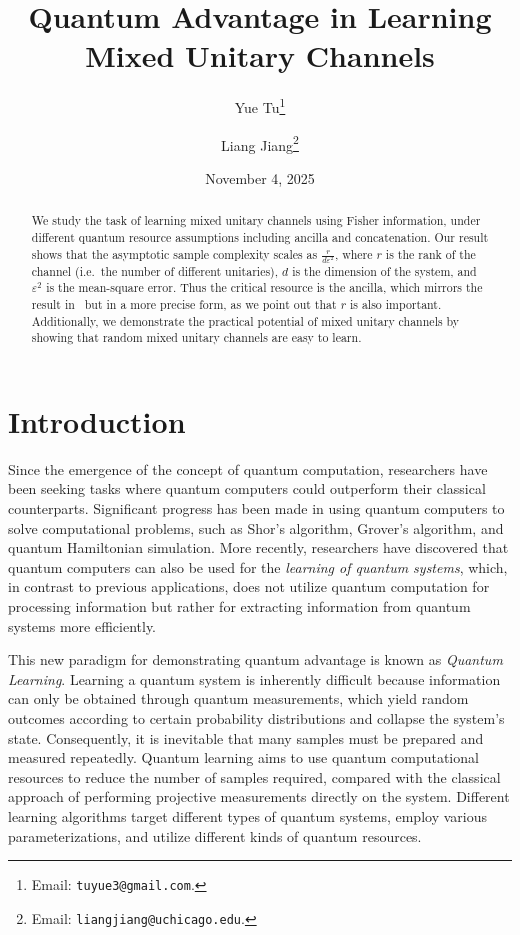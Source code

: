 \documentclass[12pt]{article}
\begin{document}
\title{Quantum Advantage in Learning Mixed Unitary Channels}

\author{
    Yue Tu\thanks{Email: \texttt{tuyue3@gmail.com}.} 
    \and 
    Liang Jiang\thanks{Email: \texttt{liangjiang@uchicago.edu}.}
}

\date{November 4, 2025}

\maketitle


\begin{abstract}
We study the task of learning mixed unitary channels using Fisher information, under different quantum resource assumptions including ancilla and concatenation. Our result shows that the asymptotic sample complexity scales as $\frac{r}{d\varepsilon^2}$, where $r$ is the rank of the channel (i.e.\ the number of different unitaries), $d$ is the dimension of the system, and $\varepsilon^2$ is the mean-square error. Thus the critical resource is the ancilla, which mirrors the result in~\cite{chen2022quantum} but in a more precise form, as we point out that $r$ is also important. Additionally, we demonstrate the practical potential of mixed unitary channels by showing that random mixed unitary channels are easy to learn.
\end{abstract}

\tableofcontents

\section{Introduction}

Since the emergence of the concept of quantum computation, researchers have been seeking tasks where quantum computers could outperform their classical counterparts. Significant progress has been made in using quantum computers to solve computational problems, such as Shor’s algorithm, Grover’s algorithm, and quantum Hamiltonian simulation. More recently, researchers have discovered that quantum computers can also be used for the \emph{learning of quantum systems}, which, in contrast to previous applications, does not utilize quantum computation for processing information but rather for extracting information from quantum systems more efficiently.

This new paradigm for demonstrating quantum advantage is known as \emph{Quantum Learning}. Learning a quantum system is inherently difficult because information can only be obtained through quantum measurements, which yield random outcomes according to certain probability distributions and collapse the system’s state. Consequently, it is inevitable that many samples must be prepared and measured repeatedly. Quantum learning aims to use quantum computational resources to reduce the number of samples required, compared with the classical approach of performing projective measurements directly on the system. Different learning algorithms target different types of quantum systems, employ various parameterizations, and utilize different kinds of quantum resources.
\end{document}
